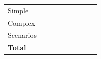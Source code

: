 \begin{table}[h]
{\begin{tabular}{l|cc|cc|cc|cc}
      Simple                             & \EXPtodo{--}                       & \EXPtodo{--}                        & \EXPtodo{--}                         & \EXPtodo{--}                          & \EXPtodo{--} & \EXPtodo{--}   & \EXPtodo{--} & \EXPtodo{--}   \\
      Complex                            & \EXPtodo{--}                       & \EXPtodo{--}                        & \EXPtodo{--}                         & \EXPtodo{--}                          & \EXPtodo{--} & \EXPtodo{--}   & \EXPtodo{--} & \EXPtodo{--}   \\
      Scenarios                          & \EXPtodo{--}                       & \EXPtodo{--}                        & \EXPtodo{--}                         & \EXPtodo{--}                          & \EXPtodo{--} & \EXPtodo{--}   & \EXPtodo{--} & \EXPtodo{--}   \\
      \midrule
      \textbf{Total}                     & \EXPtodo{--}                       & \EXPtodo{--}                        & \EXPtodo{--}                         & \EXPtodo{--}                          & \EXPtodo{--} & \EXPtodo{--}   & \EXPtodo{--} & \EXPtodo{--}   \\
      \bottomrule
    \end{tabular}%
  }
\end{table}